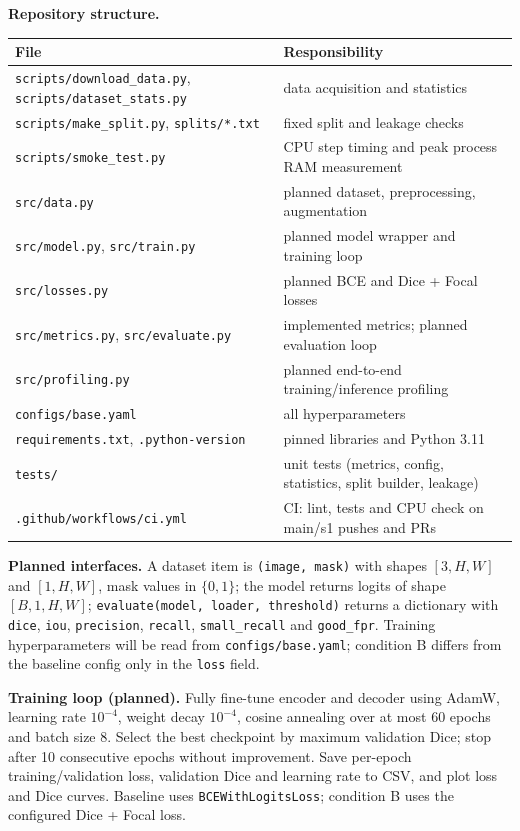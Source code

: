 \documentclass[11pt,a4paper]{article}
\begin{document}
\textbf{Repository structure.}
\begin{center}
\small
\setlength{\tabcolsep}{4pt}
\begin{tabularx}{\linewidth}{lX}
\toprule
File & Responsibility \\
\midrule
\texttt{scripts/download\_data.py}, \texttt{scripts/dataset\_stats.py} & data acquisition and statistics \\
\texttt{scripts/make\_split.py}, \texttt{splits/*.txt} & fixed split and leakage checks \\
\texttt{scripts/smoke\_test.py} & CPU step timing and peak process RAM measurement \\
\texttt{src/data.py} & planned dataset, preprocessing, augmentation \\
\texttt{src/model.py}, \texttt{src/train.py} & planned model wrapper and training loop \\
\texttt{src/losses.py} & planned BCE and Dice + Focal losses \\
\texttt{src/metrics.py}, \texttt{src/evaluate.py} & implemented metrics; planned evaluation loop \\
\texttt{src/profiling.py} & planned end-to-end training/inference profiling \\
\texttt{configs/base.yaml} & all hyperparameters \\
\texttt{requirements.txt}, \texttt{.python-version} & pinned libraries and Python 3.11 \\
\texttt{tests/} & unit tests (metrics, config, statistics, split builder, leakage) \\
\texttt{.github/workflows/ci.yml} & CI: lint, tests and CPU check on main/s1 pushes and PRs \\
\bottomrule
\end{tabularx}
\end{center}

\textbf{Planned interfaces.} A dataset item is \texttt{(image, mask)} with shapes $[3,H,W]$ and $[1,H,W]$, mask values in $\{0,1\}$; the model returns logits of shape $[B,1,H,W]$; \texttt{evaluate(model, loader, threshold)} returns a dictionary with \texttt{dice}, \texttt{iou}, \texttt{precision}, \texttt{recall}, \texttt{small\_recall} and \texttt{good\_fpr}. Training hyperparameters will be read from \texttt{configs/base.yaml}; condition B differs from the baseline config only in the \texttt{loss} field.

\textbf{Training loop (planned).} Fully fine-tune encoder and decoder using AdamW, learning rate $10^{-4}$, weight decay $10^{-4}$, cosine annealing over at most 60 epochs and batch size 8. Select the best checkpoint by maximum validation Dice; stop after 10 consecutive epochs without improvement. Save per-epoch training/validation loss, validation Dice and learning rate to CSV, and plot loss and Dice curves. Baseline uses \texttt{BCEWithLogitsLoss}; condition B uses the configured Dice + Focal loss.
\end{document}
